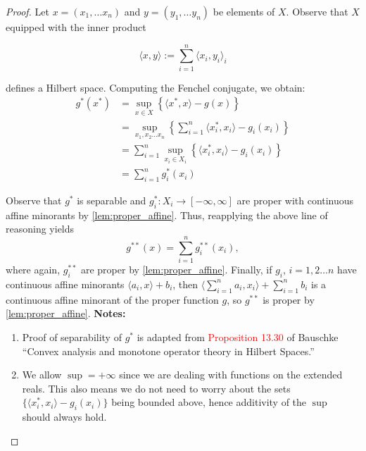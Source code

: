 \documentclass[11pt]{article}
\begin{document}
	
	\begin{proof}
		Let $x = (x_1, \ldots x_n)$ and $y = (y_1, \ldots y_n)$ be elements of $X$. Observe that $X$ equipped with the inner product 
		
		\[	\langle x, y\rangle := \sum_{i=1}^{n} \langle x_{i}, y_{i}\rangle_{i}
				\]
				
		\noindent defines a Hilbert space. 	Computing the Fenchel conjugate, we obtain:
		\begin{align*}
			g^{*}(x^{*}) 
			& = \sup_{x\in X}\left\{ 
									\langle x^*, x\rangle - g(x)
												\right\} \\
			& = \sup_{x_1,x_2\ldots x_n} \left\{
										\sum_{i=1}^{n} \langle x^{*}_{i}, x_i\rangle - g_{i}(x_i)
												\right\}	\\
			& = \sum_{i=1}^{n}	\sup_{x_i\in X_i} \left\{\langle x^{*}_{i}, x_i\rangle - g_{i}(x_i)\right\} \\
			& = \sum_{i=1}^{n} g_{i}^{*}(x_i)					
			\end{align*}
			
			\noindent Observe that $g^{*}$ is separable and $g_{i}^{*}:X_{i}\to[-\infty, \infty]$ are proper with continuous affine minorants by \autoref{lem:proper_affine}. Thus, reapplying the above line of reasoning yields 
			\[	g^{**}(x) = \sum_{i=1}^{n} g_{i}^{**}(x_i),
			\]
			where again, $g^{**}_{i}$ are proper by \autoref{lem:proper_affine}. Finally, if $g_{i}$, $i=1,2\ldots n$ have continuous affine minorants $\langle a_{i}, x\rangle + b_{i}$, then $\langle \sum_{i=1}^{n}a_i, x_i\rangle + \sum_{i=1}^{n} b_{i}$ is a continuous affine minorant of the proper function $g$, so $g^{**}$ is proper by \autoref{lem:proper_affine}.
			\newpage
			\textbf{Notes:}
			\begin{enumerate}
				\item Proof of separability of $g^{*}$ is adapted from \textcolor{red}{Proposition 13.30} of Bauschke ``Convex analysis and monotone operator theory in Hilbert Spaces.''
				
				\item We allow $\sup = +\infty$ since we are dealing with functions on the extended reals. This also means we do not need to worry about the sets $\{\langle x_i^{*}, x_i\rangle - g_{i}(x_i)\}$ being bounded above, hence additivity of the $\sup$ should always hold.  
				\end{enumerate}
			
			
		\end{proof}
\end{document}

